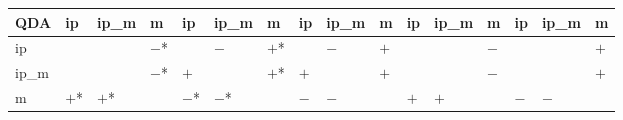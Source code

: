 \begin{table}[htbp]
{\begin{tabular}{l|lll|lll|lll|lll|lll}
\hline
\textbf{QDA} & ip         & ip\_m      & m          & ip         & ip\_m      & m          & ip         & ip\_m      & m          & ip         & ip\_m      & m          & ip         & ip\_m      & m           \\
\hline
ip           &            &            & $-$*       &            & $-$        & $+$*       &            & $-$        & $+$        &            &            & $-$        &            &            & $+$         \\
ip\_m        &            &            & $-$*       & $+$        &            & $+$*       & $+$        &            & $+$        &            &            & $-$        &            &            & $+$         \\
m            & $+$*       & $+$*       &            & $-$*       & $-$*       &            & $-$        & $-$        &            & $+$        & $+$        &            & $-$        & $-$        &             \\
\hline
\hline
\end{tabular}

  }
\end{table}




